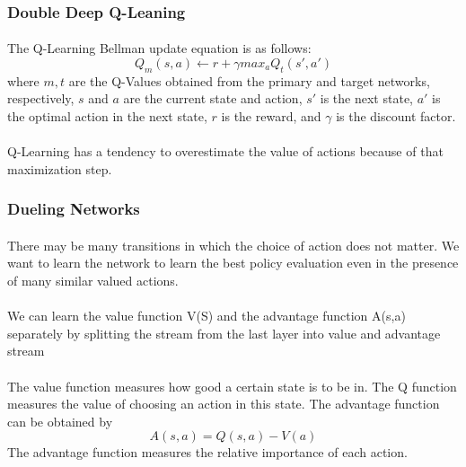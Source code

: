 \documentclass[letterpaper,twocolumn,10pt]{article}
\begin{document}
            \subsubsection{Double Deep Q-Leaning}
                \paragraph{} The Q-Learning Bellman update equation is as follows:
                $$
                    Q_m(s, a) \leftarrow r + \gamma max_a Q_t(s', a')
                $$
                where $m, t$ are the Q-Values obtained from the primary and target networks, respectively, $s$ and $a$ are the current state and action, $s'$ is the next state, $a'$ is the optimal action in the next state, $r$ is the reward, and $\gamma$ is the discount factor.
                \paragraph{}Q-Learning has a tendency to overestimate the value of actions because of that maximization step.~\cite{DBLP:journals/corr/HasseltGS15}

            \subsubsection{Dueling Networks}
                
                
                \paragraph{}There may be many transitions in which the choice of action does not matter. We want to learn the network to learn the best policy evaluation even in the presence of many similar valued actions.~\cite{DBLP:journals/corr/WangFL15}

                \paragraph{}We can learn the value function V(S) and the advantage function A(s,a) separately by splitting the stream from the last layer into value and advantage stream~\cite{DBLP:journals/corr/WangFL15}

                \paragraph{}The value function measures how good a certain state is to be in. The Q function measures the value of choosing an action in this state. The advantage function can be obtained by $$ A(s,a) = Q(s, a) - V(a) $$ The advantage function measures the relative importance of each action.~\cite{DBLP:journals/corr/WangFL15}
                
\end{document}
